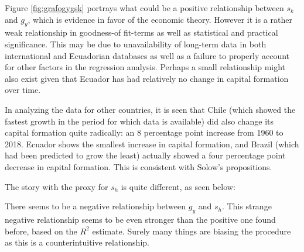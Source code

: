 \documentclass[12pt,twoside,a4paper]{article}
\numberwithin{equation}{section}
\begin{document}
Figure \ref{fig:grafogygsk} portrays what could be a positive relationship between $s_k$ and $g_y$, which is evidence in favor of the economic theory. However it is a rather weak relationship in goodness-of fit-terms as well as statistical and practical significance. This may be due to unavailability of long-term data in both international and Ecuadorian databases as well as a failure to properly account for other factors in the regression analysis. Perhaps a small relationship might also exist given that Ecuador has had relatively no change in capital formation over time. 

In analyzing the data for other countries, it is seen that Chile (which showed the fastest growth in the period for which data is available) did also change its capital formation quite radically: an 8 percentage point increase from 1960 to 2018. Ecuador shows the smallest increase in capital formation, and Brazil (which had been predicted to grow the least) actually showed a four percentage point decrease in capital formation. This is consistent with Solow's propositions. 

The story with the proxy for $s_h$ is quite different, as seen below: 

\begin{figure}[H]
\end{figure}
There seems to be a negative relationship between $g_y$ and $s_h$.  This strange negative relationship seems to be even stronger than the positive one found before, based on the $R^2$ estimate. Surely many things are biasing the procedure as this is a counterintuitive relationship. 
\end{document}
